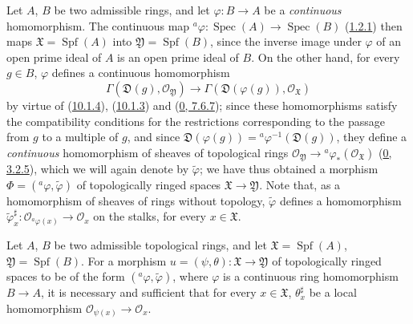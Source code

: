 \begin{env}[10.2.1]
\label{I.10.2.1}
Let $A$, $B$ be two admissible rings, and let
$\varphi:B\to A$ be a \emph{continuous} homomorphism. The continuous map
$ {}^a\varphi:\operatorname{Spec}(A)\to\operatorname{Spec}(B)$
(\hyperref[I.1.2.1]{1.2.1}) then maps
$\mathfrak{X}=\operatorname{Spf}(A)$ into
$\mathfrak{Y}=\operatorname{Spf}(B)$, since the inverse image under
$\varphi$ of an open prime ideal of $A$ is an open prime ideal of
$B$. On the other hand, for every $g\in B$, $\varphi$ defines a continuous
homomorphism
\[
  \Gamma(\mathfrak{D}(g),\mathscr{O}_{\mathfrak{Y}})
  \longrightarrow
  \Gamma(\mathfrak{D}(\varphi(g)),\mathscr{O}_{\mathfrak{X}})
\]
by virtue of (\hyperref[I.10.1.4]{10.1.4}),
(\hyperref[I.10.1.3]{10.1.3}) and
(\hyperref[0.7.6.7]{0, 7.6.7}); since these homomorphisms satisfy the
compatibility conditions for the restrictions corresponding to the
passage from $g$ to a multiple of $g$, and since
$\mathfrak{D}(\varphi(g))={}^a\varphi^{-1}(\mathfrak{D}(g))$, they
define a \emph{continuous} homomorphism of sheaves of topological
rings
$\mathscr{O}_{\mathfrak{Y}}\to
{}^a\varphi_*(\mathscr{O}_{\mathfrak{X}})$
(\hyperref[0.3.2.5]{0, 3.2.5}), which we will again denote by
$\widetilde{\varphi}$; we have thus obtained a morphism
$\Phi=({}^a\varphi,\widetilde{\varphi})$ of topologically ringed spaces
$\mathfrak{X}\to\mathfrak{Y}$. Note that, as a homomorphism of
sheaves of rings without topology, $\widetilde{\varphi}$ defines a
homomorphism
$\widetilde{\varphi}_x^\sharp:
\mathscr{O}_{{}^a\varphi(x)}\to\mathscr{O}_x$ on the stalks, for every
$x\in\mathfrak{X}$.
\end{env}

\begin{proposition}[10.2.2]
\label{I.10.2.2}
Let $A$, $B$ be two admissible topological rings, and let
$\mathfrak{X}=\operatorname{Spf}(A)$,
$\mathfrak{Y}=\operatorname{Spf}(B)$. For a morphism
$u=(\psi,\theta):\mathfrak{X}\to\mathfrak{Y}$ of topologically ringed
spaces to be of the form $({}^a\varphi,\widetilde{\varphi})$, where
$\varphi$ is a continuous ring homomorphism $B\to A$, it is necessary and
sufficient that for every $x\in\mathfrak{X}$,
$\theta_x^\sharp$ be a local homomorphism
$\mathscr{O}_{\psi(x)}\to\mathscr{O}_x$.
\end{proposition}

